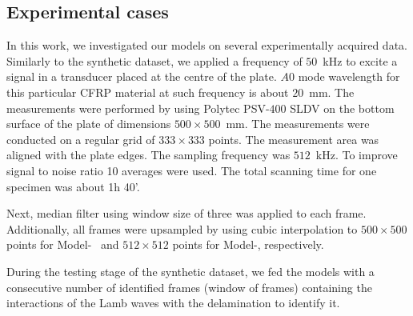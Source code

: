 \subsection{Experimental cases}
In this work, we investigated our models on several experimentally acquired data.
Similarly to the synthetic dataset, we applied a frequency of \(50\)~kHz to excite a signal in a transducer placed at the centre of the plate. 
\(A0\) mode wavelength for this particular CFRP material at such frequency is about \(20\)~mm. 
The measurements were performed by using Polytec PSV-\(400\) SLDV on the bottom surface of the plate of dimensions \(500\times500\)~mm. 
The measurements were conducted on a regular grid of \(333\times333\) points. 
The measurement area was aligned with the plate edges.
The sampling frequency was \(512\)~kHz.
To improve signal to noise ratio 10 averages were used.
The total scanning time for one specimen was about 1h 40'.

Next, median filter using window size of three was applied to each frame. Additionally, all frames were upsampled by using cubic interpolation to \(500 \times 500\) points for Model-~ and \(512\times512\) points for Model-, respectively.

During the testing stage of the synthetic dataset, we fed the models with a consecutive number of identified frames (window of frames) containing the interactions of the Lamb waves with the delamination to identify it.

